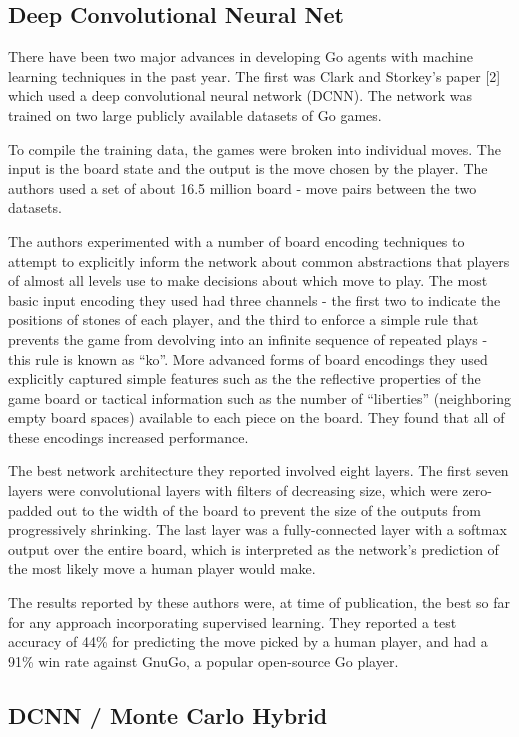 \subsection{Deep Convolutional Neural Net}
There have been two major advances in developing Go agents with machine learning techniques in the past year. The first was Clark and Storkey's paper [2] which used a deep convolutional neural network (DCNN). The network was trained on two large publicly available datasets of Go games.

To compile the training data, the games were broken into individual moves. The input is the board state and the output is the move chosen by the player. The authors used a set of about 16.5 million board - move pairs between the two datasets.

The authors experimented with a number of board encoding techniques to attempt to explicitly inform the network about common abstractions that players of almost all levels use to make decisions about which move to play. The most basic input encoding they used had three channels - the first two to indicate the positions of stones of each player, and the third to enforce a simple rule that prevents the game from devolving into an infinite sequence of repeated plays - this rule is known as ``ko''. More advanced forms of board encodings they used explicitly captured simple features such as the the reflective properties of the game board or tactical information such as the number of ``liberties'' (neighboring empty board spaces) available to each piece on the board. They found that all of these encodings increased performance.

The best network architecture they reported involved eight layers. The first seven layers were convolutional layers with filters of decreasing size, which were zero-padded out to the width of the board to prevent the size of the outputs from progressively shrinking. The last layer was a fully-connected layer with a softmax output over the entire board, which is interpreted as the network's prediction of the most likely move a human player would make.

The results reported by these authors were, at time of publication, the best so far for any approach incorporating supervised learning. They reported a test accuracy of 44\% for predicting the move picked by a human player, and had a 91\% win rate against GnuGo, a popular open-source Go player. 

\subsection{DCNN / Monte Carlo Hybrid}

